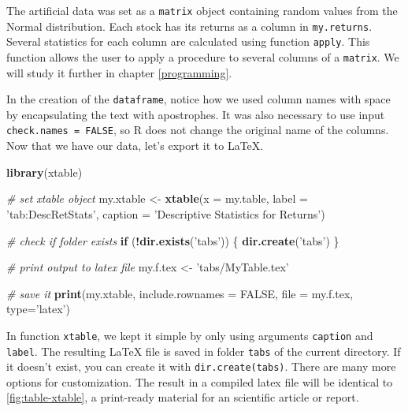 \documentclass[11pt,]{book}
\newenvironment{Shaded}{\begin{snugshade}}{\end{snugshade}}
\newcommand{\KeywordTok}[1]{\textcolor[rgb]{0.27,0.27,0.27}{\textbf{#1}}}
\newcommand{\DataTypeTok}[1]{\textcolor[rgb]{0.27,0.27,0.27}{#1}}
\newcommand{\StringTok}[1]{\textcolor[rgb]{0.5,0.5,0.5}{#1}}
\newcommand{\CommentTok}[1]{\textcolor[rgb]{0.56,0.35,0.01}{\textit{#1}}}
\newcommand{\OtherTok}[1]{\textcolor[rgb]{0.56,0.35,0.01}{#1}}
\newcommand{\ControlFlowTok}[1]{\textcolor[rgb]{0.13,0.29,0.53}{\textbf{#1}}}
\newcommand{\OperatorTok}[1]{\textcolor[rgb]{0.81,0.36,0.00}{\textbf{#1}}}
\newcommand{\NormalTok}[1]{#1}
\begin{document}
The artificial data was set as a \texttt{matrix} object containing
random values from the Normal distribution. Each stock has its returns
as a column in \texttt{my.returns}. Several statistics for each column
are calculated using function \texttt{apply}. This function allows the
user to apply a procedure to several columns of a \texttt{matrix}. We
will study it further in chapter \ref{programming}.

In the creation of the \texttt{dataframe}, notice how we used column
names with space by encapsulating the text with apostrophes. It was also
necessary to use input \texttt{check.names\ =\ FALSE}, so R does not
change the original name of the columns. Now that we have our data,
let's export it to LaTeX.

\begin{Shaded}
\begin{Highlighting}[]
\KeywordTok{library}\NormalTok{(xtable)}

\CommentTok{# set xtable object}
\NormalTok{my.xtable <-}\StringTok{ }\KeywordTok{xtable}\NormalTok{(}\DataTypeTok{x =}\NormalTok{ my.table, }
                    \DataTypeTok{label =} \StringTok{'tab:DescRetStats'}\NormalTok{,}
                    \DataTypeTok{caption =} \StringTok{'Descriptive Statistics for Returns'}\NormalTok{)}

\CommentTok{# check if folder exists}
\ControlFlowTok{if}\NormalTok{ (}\OperatorTok{!}\KeywordTok{dir.exists}\NormalTok{(}\StringTok{'tabs'}\NormalTok{)) \{ }
    \KeywordTok{dir.create}\NormalTok{(}\StringTok{'tabs'}\NormalTok{)}
\NormalTok{\}}

\CommentTok{# print output to latex file}
\NormalTok{my.f.tex <-}\StringTok{ 'tabs/MyTable.tex'}

\CommentTok{# save it}
\KeywordTok{print}\NormalTok{(my.xtable,}
      \DataTypeTok{include.rownames =} \OtherTok{FALSE}\NormalTok{,}
      \DataTypeTok{file =}\NormalTok{ my.f.tex,}
      \DataTypeTok{type=}\StringTok{'latex'}\NormalTok{)}
\end{Highlighting}
\end{Shaded}

In function \texttt{xtable}, we kept it simple by only using arguments
\texttt{caption} and \texttt{label}. The resulting LaTeX file is saved
in folder \texttt{tabs} of the current directory. If it doesn't exist,
you can create it with
\texttt{dir.create(\textquotesingle{}tabs\textquotesingle{})}. There are
many more options for customization. The result in a compiled latex file
will be identical to \ref{fig:table-xtable}, a print-ready material for
an scientific article or report.
\end{document}
